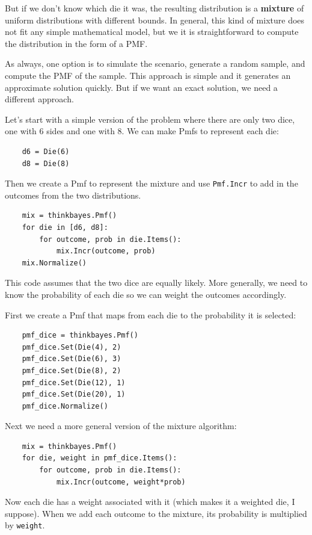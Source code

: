 \documentclass[12pt]{book}
\begin{document}
But if we don't know which die it was, the resulting distribution is
a {\bf mixture} of uniform distributions with different bounds.
In general, this kind of mixture does not fit any simple mathematical
model, but we it is straightforward to compute the distribution in
the form of a PMF.

As always, one option is to simulate the scenario, generate a random
sample, and compute the PMF of the sample.  This approach is simple
and it generates an approximate solution quickly.  But if we want an
exact solution, we need a different approach.

Let's start with a simple version of the problem where there are
only two dice, one with 6 sides and one with 8.  We can make Pmfs to
represent each die:

\begin{verbatim}
    d6 = Die(6)
    d8 = Die(8)
\end{verbatim}

Then we create a Pmf to represent the mixture and use {\tt Pmf.Incr}
to add in the outcomes from the two distributions.

\begin{verbatim}
    mix = thinkbayes.Pmf()
    for die in [d6, d8]:
        for outcome, prob in die.Items():
            mix.Incr(outcome, prob)
    mix.Normalize()
\end{verbatim}

This code assumes that the two dice are equally likely.  More
generally, we need to know the probability of each die so we can
weight the outcomes accordingly.

First we create a Pmf that maps from each die to the probability it is
selected:

\begin{verbatim}
    pmf_dice = thinkbayes.Pmf()
    pmf_dice.Set(Die(4), 2)
    pmf_dice.Set(Die(6), 3)
    pmf_dice.Set(Die(8), 2)
    pmf_dice.Set(Die(12), 1)
    pmf_dice.Set(Die(20), 1)
    pmf_dice.Normalize()
\end{verbatim}

Next we need a more general version of the mixture algorithm:

\begin{verbatim}
    mix = thinkbayes.Pmf()
    for die, weight in pmf_dice.Items():
        for outcome, prob in die.Items():
            mix.Incr(outcome, weight*prob)
\end{verbatim}

Now each die has a weight associated with it (which makes it a
weighted die, I suppose).  When we add each outcome to the mixture,
its probability is multiplied by {\tt weight}.
\end{document}
